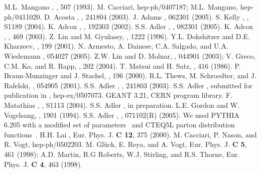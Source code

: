 \documentclass[aps,prl,superscriptaddress,showpacs,floatfix,twocolumn]{revtex4}
\begin{document}
\begin{references}
  M.L. Mangano \etal, , 507 (1993).
  M. Cacciari, hep-ph/0407187; 
  M.L. Mangano, hep-ph/0411020.
  D. Acosta \etal, , 241804 (2003).
  J. Adams \etal,  062301 (2005).
  S. Kelly \etal, , S1189 (2004).
  K. Adcox \etal, , 192303 (2002).
  S.S. Adler \etal, , 082301 (2005).
  K. Adcox \etal, , 469 (2003).  
  Z. Lin and M. Gyulassy, , 1222 (1996).
  Y.L. Dokshitzer and D.E. Kharzeev, , 199 (2001).
  N. Armesto, A. Dainese, C.A. Salgado, and U.A. Wiedemann
  , 054027 (2005).
  Z.W. Lin and D. Molnar, , 044901 (2003);
  V. Greco, C.M. Ko, and R. Rapp, , 202 (2004).
  T. Matsui and H. Satz, , 416 (1986).
  P. Braun-Munzinger and J. Stachel, , 196 (2000).
  R.L. Thews, M. Schroedter, and J. Rafelski, , 054905 (2001).
  S.S. Adler \etal, , 241803 (2003).
  S.S. Adler \etal, submitted for publication in \PRL, hep-ex/0507073.
  GEANT 3.21, CERN program library.
  F. Matathias \etal, , S1113 (2004).
  S.S. Adler \etal, in preparation.
  L.E. Gordon and W. Vogelsang, , 1901 (1994).
  S.S. Adler \etal, , 071102(R) (2005).
  We used PYTHIA 6.205 with a modified set of parameters~\cite{phenix_auau130} 
  and CTEQ5L parton distribution functions~\cite{cteq5l}.
  H.H. Lai \etal, Eur. Phys. J. {\bf C 12}, 375 (2000).
  M. Cacciari, P. Nason, and R. Vogt, hep-ph/0502203.
  M. Gl\"uck, E. Reya, and A. Vogt, Eur. Phys. J. {\bf C 5}, 461 (1998);
  A.D. Martin, R.G Roberts, W.J. Stirling, and R.S. Thorne, 
  Eur. Phys. J. {\bf C 4}, 463 (1998).
\end{references}
\end{document}
